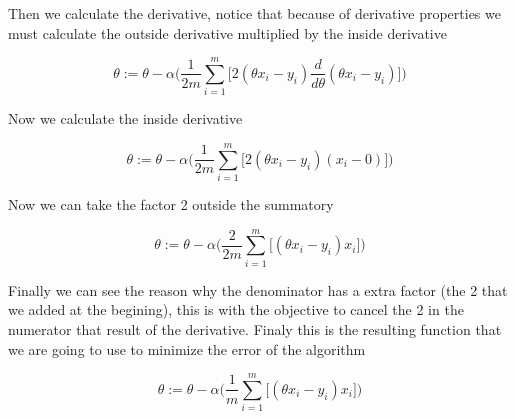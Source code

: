 \documentclass[12pt,journal]{IEEEtran}
\begin{document}
    Then we calculate the derivative, notice that because of derivative
    properties we must calculate the outside derivative multiplied by the inside
    derivative

    \begin{equation}
        \theta := \theta - \alpha
            \Bigg(
                \frac{1}{2m} \sum_{i=1}^{m}
                    \Bigg[
                        2(\theta x_i - y_i) \frac{d}{d \theta}(\theta x_i - y_i)
                    \Bigg]
            \Bigg)
    \end{equation}

    Now we calculate the inside derivative

    \begin{equation}
        \theta := \theta - \alpha
            \Bigg(
                \frac{1}{2m} \sum_{i=1}^{m}
                    \Big[
                        2 (\theta x_i - y_i) (x_i - 0)
                    \Big]
            \Bigg)
    \end{equation}

    Now we can take the factor 2 outside the summatory

    \begin{equation}
        \theta := \theta - \alpha
            \Bigg(
                \frac{2}{2m} \sum_{i=1}^{m}
                    \Big[
                        (\theta x_i - y_i) x_i
                    \Big]
            \Bigg)
    \end{equation}

    Finally we can see the reason why the denominator has a extra factor
    (the 2 that we added at the begining), this is with the objective
    to cancel the 2 in the numerator that result of the derivative. Finaly
    this is the resulting function that we are going to use to minimize the
    error of the algorithm

    \begin{equation}
        \theta := \theta - \alpha
            \Bigg(
                \frac{1}{m} \sum_{i=1}^{m}
                    \Big[
                        (\theta x_i - y_i) x_i
                    \Big]
            \Bigg)
    \end{equation}
\end{document}

